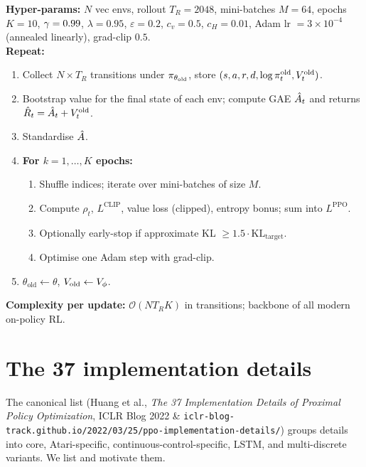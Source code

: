 \documentclass[11pt,oneside]{scrbook}
\begin{document}
\begin{tcolorbox}[colback=rlbg, colframe=rlblue, title=\textbf{PPO (Schulman 2017) --- the canonical loop}]
\textbf{Hyper-params:} $N$ vec envs, rollout $T_R = 2048$, mini-batches $M=64$, epochs $K=10$, $\gamma=0.99$, $\lambda=0.95$, $\varepsilon=0.2$, $c_v=0.5$, $c_H = 0.01$, Adam lr $= 3\times 10^{-4}$ (annealed linearly), grad-clip $0.5$.\\
\textbf{Repeat:}
\begin{enumerate}[leftmargin=*]
  \item Collect $N \times T_R$ transitions under $\pi_{\theta_\text{old}}$, store $(s, a, r, d, \log\pi_t^\text{old}, V_t^\text{old})$.
  \item Bootstrap value for the final state of each env; compute GAE $\hat{A}_t$ and returns $\hat R_t = \hat{A}_t + V_t^\text{old}$.
  \item Standardise $\hat{A}$.
  \item \textbf{For $k=1,\ldots,K$ epochs:}
    \begin{enumerate}
      \item Shuffle indices; iterate over mini-batches of size $M$.
      \item Compute $\rho_t$, $L^{\mathrm{CLIP}}$, value loss (clipped), entropy bonus; sum into $L^{\mathrm{PPO}}$.
      \item Optionally early-stop if approximate KL $\ge 1.5 \cdot \mathrm{KL}_\text{target}$.
      \item Optimise one Adam step with grad-clip.
    \end{enumerate}
  \item $\theta_\text{old} \leftarrow \theta$, $V_\text{old} \leftarrow V_\phi$.
\end{enumerate}
\textbf{Complexity per update:} $\mathcal{O}(N T_R K)$ in transitions; backbone of all modern on-policy RL.
\end{tcolorbox}

\section{The 37 implementation details}

The canonical list (Huang et al., \emph{The 37 Implementation Details of Proximal Policy Optimization}, ICLR Blog 2022 \& \texttt{iclr-blog-track.github.io/2022/03/25/ppo-implementation-details/}) groups details into core, Atari-specific, continuous-control-specific, LSTM, and multi-discrete variants. We list and motivate them.
\end{document}
